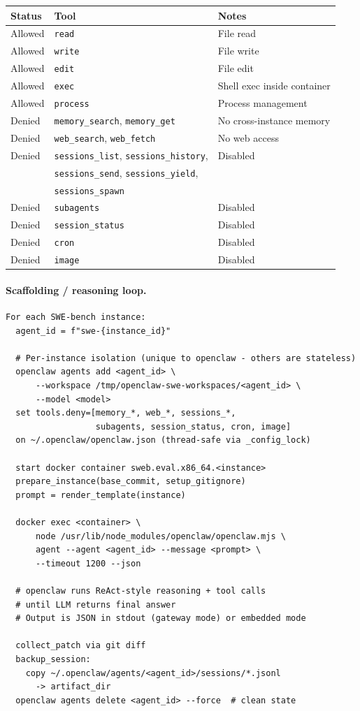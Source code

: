 \begin{center}
\begin{tabular}{lll}
\toprule
\textbf{Status} & \textbf{Tool} & \textbf{Notes} \\
\midrule
Allowed & \texttt{read} & File read \\
Allowed & \texttt{write} & File write \\
Allowed & \texttt{edit} & File edit \\
Allowed & \texttt{exec} & Shell exec inside container \\
Allowed & \texttt{process} & Process management \\
Denied & \texttt{memory\_search}, \texttt{memory\_get} & No cross-instance memory \\
Denied & \texttt{web\_search}, \texttt{web\_fetch} & No web access \\
Denied & \texttt{sessions\_list}, \texttt{sessions\_history}, & Disabled \\
        & \texttt{sessions\_send}, \texttt{sessions\_yield}, & \\
        & \texttt{sessions\_spawn} & \\
Denied & \texttt{subagents} & Disabled \\
Denied & \texttt{session\_status} & Disabled \\
Denied & \texttt{cron} & Disabled \\
Denied & \texttt{image} & Disabled \\
\bottomrule
\end{tabular}
\end{center}

\paragraph{Scaffolding / reasoning loop.}
\begin{verbatim}
For each SWE-bench instance:
  agent_id = f"swe-{instance_id}"

  # Per-instance isolation (unique to openclaw - others are stateless)
  openclaw agents add <agent_id> \
      --workspace /tmp/openclaw-swe-workspaces/<agent_id> \
      --model <model>
  set tools.deny=[memory_*, web_*, sessions_*,
                  subagents, session_status, cron, image]
  on ~/.openclaw/openclaw.json (thread-safe via _config_lock)

  start docker container sweb.eval.x86_64.<instance>
  prepare_instance(base_commit, setup_gitignore)
  prompt = render_template(instance)

  docker exec <container> \
      node /usr/lib/node_modules/openclaw/openclaw.mjs \
      agent --agent <agent_id> --message <prompt> \
      --timeout 1200 --json

  # openclaw runs ReAct-style reasoning + tool calls
  # until LLM returns final answer
  # Output is JSON in stdout (gateway mode) or embedded mode

  collect_patch via git diff
  backup_session:
    copy ~/.openclaw/agents/<agent_id>/sessions/*.jsonl
      -> artifact_dir
  openclaw agents delete <agent_id> --force  # clean state
\end{verbatim}

